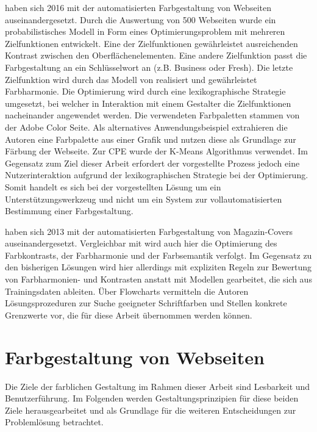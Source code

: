 \documentclass[11pt, bibliography=totoc]{scrartcl}
\begin{document}
\citet{webpage} haben sich 2016 mit der automatisierten Farbgestaltung von Webseiten auseinandergesetzt. Durch die Auswertung von 500 Webseiten wurde ein probabilistisches Modell in Form eines Optimierungsproblem mit mehreren Zielfunktionen entwickelt. Eine der Zielfunktionen gewährleistet ausreichenden Kontrast zwischen den Oberflächenelementen. Eine andere Zielfunktion passt die Farbgestaltung an ein Schlüsselwort an (z.B. \glqq{}Business\grqq{} oder \glqq{}Fresh\grqq{}). Die letzte Zielfunktion wird durch das Modell von \citet{colorcomp} realisiert und gewährleistet Farbharmonie. Die Optimierung wird durch eine lexikographische Strategie umgesetzt, bei welcher in Interaktion mit einem Gestalter die Zielfunktionen nacheinander angewendet werden. Die verwendeten Farbpaletten stammen von der Adobe Color Seite. Als alternatives Anwendungsbeispiel extrahieren die Autoren eine Farbpalette aus einer Grafik und nutzen diese als Grundlage zur Färbung der Webseite. Zur CPE wurde der K-Means Algorithmus verwendet. Im Gegensatz zum Ziel dieser Arbeit erfordert der vorgestellte Prozess jedoch eine Nutzerinteraktion aufgrund der lexikographischen Strategie bei der Optimierung. Somit handelt es sich bei der vorgestellten Lösung um ein Unterstützungswerkzeug und nicht um ein System zur vollautomatisierten Bestimmung einer Farbgestaltung.

\citet{magazines}  haben sich 2013 mit der automatisierten Farbgestaltung von Magazin-Covers auseinandergesetzt. Vergleichbar mit \citep{webpage} wird auch hier die Optimierung des Farbkontrasts, der Farbharmonie und der Farbsemantik verfolgt.  Im Gegensatz zu den bisherigen Lösungen wird hier allerdings mit expliziten Regeln zur Bewertung von Farbharmonien- \citep{itten} und Kontrasten anstatt mit Modellen gearbeitet, die sich aus Trainingsdaten ableiten. Über Flowcharts vermitteln die Autoren Lösungsprozeduren zur Suche geeigneter Schriftfarben und Stellen konkrete Grenzwerte vor, die für diese Arbeit übernommen werden können.





\section{Farbgestaltung von Webseiten}
\label{sec:farbgestaltung}
Die Ziele der farblichen Gestaltung im Rahmen dieser Arbeit sind Lesbarkeit und Benutzerführung. Im Folgenden werden Gestaltungsprinzipien für diese beiden Ziele herausgearbeitet und als Grundlage für die weiteren Entscheidungen zur Problemlösung betrachtet.
\end{document}
